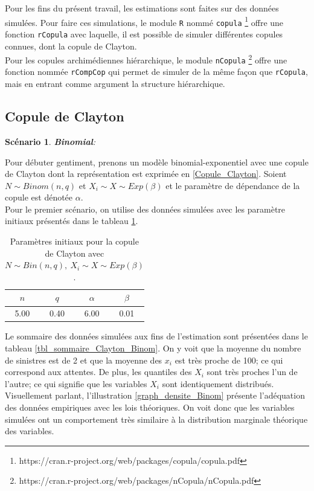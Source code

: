 \documentclass{article}
\newtheorem{Scenario}{Scénario}
\begin{document}
		Pour les fins du présent travail, les estimations sont faites sur des données simulées. Pour faire ces simulations, le module \texttt{R} nommé \texttt{copula} \footnote{https://cran.r-project.org/web/packages/copula/copula.pdf}
		offre une fonction \texttt{rCopula} avec laquelle, il est possible de simuler différentes copules connues, dont la copule de Clayton. \\
		
		Pour les copules archimédiennes hiérarchique, le module \texttt{nCopula} \footnote{https://cran.r-project.org/web/packages/nCopula/nCopula.pdf} offre une fonction nommée \texttt{rCompCop} qui permet de simuler de la même façon que \texttt{rCopula}, mais en entrant comme argument la structure hiérarchique.
	
	\subsection{Copule de Clayton}
		 \begin{Scenario}\label{scenario_Clayton_Binom}
			\textbf{Binomial}:
		 \end{Scenario}
	 
		 Pour débuter gentiment, prenons un modèle binomial-exponentiel avec une copule de Clayton dont la représentation est exprimée en \eqref{Copule_Clayton}.
		 Soient $N \sim Binom(n,q)$ et $X_i \sim X \sim Exp(\beta)$ et le paramètre de dépendance de la copule est dénotée $\alpha$.\\
	
		 Pour le premier scénario, on utilise des données simulées avec les paramètre initiaux présentés dans le tableau \ref{tbl_para_initiaux_Clayton_Binom}.
		 
		 \begin{table}[H]
		 	\centering
		 	\begin{tabular}{cccc}
		 		\hline
		 		$n$ & $q$ & $\alpha$ & $\beta$ \\ 
		 		\hline
		 		5.00 & 0.40 & 6.00 & 0.01 \\ 
		 		\hline
		 	\end{tabular}
	 	\caption{Paramètres initiaux pour la copule de Clayton avec $N \sim Bin(n, q),\ X_i \sim X \sim Exp(\beta)$.}
	 	\label{tbl_para_initiaux_Clayton_Binom}
		 \end{table}
		 
		Le sommaire des données simulées aux fins de l'estimation sont présentées dans le tableau \ref{tbl_sommaire_Clayton_Binom}. On y voit que la moyenne du nombre de sinistres est de 2 et que la moyenne des $x_i$ est très proche de 100; ce qui correspond aux attentes.
		De plus, les quantiles des $X_i$ sont très proches l'un de l'autre; ce qui signifie que les variables $X_i$ sont identiquement distribués. Visuellement parlant, l'illustration \ref{graph_densite_Binom} présente l'adéquation des données empiriques avec les lois théoriques. On voit donc que les variables simulées ont un comportement très similaire à la distribution marginale théorique des variables.\\
		
\end{document}
